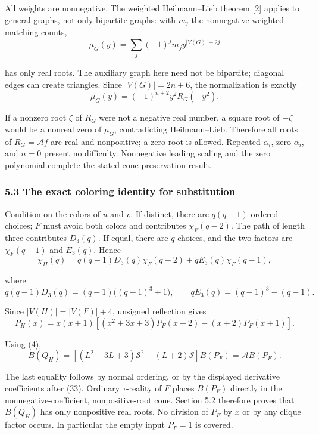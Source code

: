 \documentclass[
  11pt,
  a4paper,
]{article}
\begin{document}
All weights are nonnegative. The weighted Heilmann--Lieb theorem {[}2{]}
applies to general graphs, not only bipartite graphs: with \(m_j\) the
nonnegative weighted matching counts,
\nopagebreak
\[
\mu_G(y)=\sum_j(-1)^jm_jy^{|V(G)|-2j}
\]

has only real roots. The auxiliary graph here need not be bipartite;
diagonal edges can create triangles. Since \(|V(G)|=2n+6\), the
normalization is exactly
\nopagebreak
\[
\mu_G(y)=(-1)^{n+2}y^2R_G(-y^2).\tag{36}
\]

If a nonzero root \(\zeta\) of \(R_G\) were not a negative real number,
a square root of \(-\zeta\) would be a nonreal zero of \(\mu_G\),
contradicting Heilmann--Lieb. Therefore all roots of
\(R_G=\mathcal A f\) are real and nonpositive; a zero root is allowed.
Repeated \(\alpha_i\), zero \(\alpha_i\), and \(n=0\) present no
difficulty. Nonnegative leading scaling and the zero polynomial complete
the stated cone-preservation result.

\subsubsection{5.3 The exact coloring identity for
substitution}\label{the-exact-coloring-identity-for-substitution}

Condition on the colors of \(u\) and \(v\). If distinct, there are
\(q(q-1)\) ordered choices; \(F\) must avoid both colors and contributes
\(\chi_F(q-2)\). The path of length three contributes \(D_3(q)\). If
equal, there are \(q\) choices, and the two factors are \(\chi_F(q-1)\)
and \(E_3(q)\). Hence
\nopagebreak
\[
\chi_H(q)=q(q-1)D_3(q)\chi_F(q-2)
+qE_3(q)\chi_F(q-1),\tag{37}
\]

where
\nopagebreak
\[
q(q-1)D_3(q)=(q-1)\bigl((q-1)^3+1\bigr),\qquad
qE_3(q)=(q-1)^3-(q-1).
\]

Since \(|V(H)|=|V(F)|+4\), unsigned reflection gives
\nopagebreak
\[
P_H(x)=x(x+1)\left[
(x^2+3x+3)P_F(x+2)-(x+2)P_F(x+1)\right].\tag{38}
\]

Using (4),
\nopagebreak
\[
B(Q_H)=\left[(L^2+3L+3)\mathcal S^2-(L+2)\mathcal S\right]B(P_F)
=\mathcal A B(P_F).\tag{39}
\]

The last equality follows by normal ordering, or by the displayed
derivative coefficients after (33). Ordinary \(\tau\)-reality of \(F\)
places \(B(P_F)\) directly in the nonnegative-coefficient,
nonpositive-root cone. Section 5.2 therefore proves that \(B(Q_H)\) has
only nonpositive real roots. No division of \(P_F\) by \(x\) or by any
clique factor occurs. In particular the empty input \(P_F=1\) is
covered.
\end{document}
